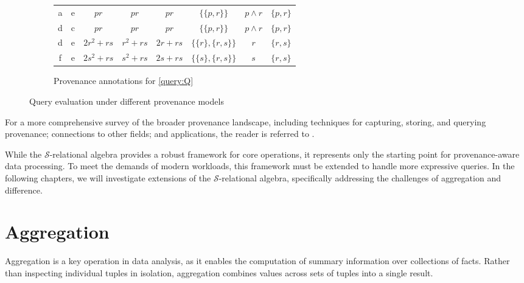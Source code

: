 \documentclass[oneside, 11pt]{amsbook}
\theoremstyle{plain}
\theoremstyle{definition}
\theoremstyle{remark}
\begin{document}
\begin{exmpl}
\begin{figure}[htbp]
\begin{subfigure}[t]{\textwidth}
\begin{tabular}{cc|c|c|c|c|c|c}
                a & e & $pr$            & $pr$            & $pr$      & $\{\{p,r\}\}$       & $p \land r$  & $\{p,r\}$ \\

                d & c & $pr$            & $pr$            & $pr$      & $\{\{p,r\}\}$       & $p \land r$  & $\{p,r\}$ \\

                d & e & $2r^{2} + rs$   & $r^{2} + rs$    & $2r + rs$ & $\{\{r\},\{r,s\}\}$ & $r$          & $\{r,s\}$ \\

                f & e & $2s^{2} + rs$   & $s^{2} + rs$    & $2s + rs$ & $\{\{s\},\{r,s\}\}$ & $s$          & $\{r,s\}$
            \end{tabular}
            \caption{Provenance annotations for \autoref{query:Q}}
            \label{fig:provQ}
        \end{subfigure}

        \caption{Query evaluation under different provenance models}
        \label{fig:example_and_provenance}
    \end{figure}

\end{exmpl}

For a more comprehensive survey of the broader provenance landscape, including techniques for capturing, storing, and querying provenance; connections to other fields; and applications, the reader is referred to \cite{Glavic2021}.

While the $\mathcal{S}$-relational algebra provides a robust framework for core operations, it represents only the starting point for provenance-aware data processing. To meet the demands of modern workloads, this framework must be extended to handle more expressive queries. In the following chapters, we will investigate extensions of the $\mathcal{S}$-relational algebra, specifically addressing the challenges of aggregation and difference.

\chapter{Aggregation}
\label{chapter:aggregation}

Aggregation is a key operation in data analysis, as it enables the computation of summary information over collections of facts. Rather than inspecting individual tuples in isolation, aggregation combines values across sets of tuples into a single result.
\end{document}
